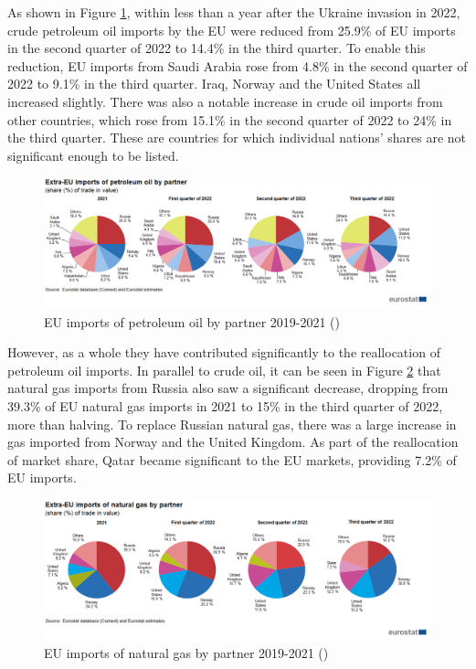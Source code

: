 \documentclass[12pt]{article}
\begin{document}
As shown in Figure \ref{fig:eu oil import}, within less than a year after the Ukraine invasion in 2022, crude petroleum oil imports by the EU were reduced from 25.9\% of EU imports in the second quarter of 2022 to 14.4\% in the third quarter. To enable this reduction, EU imports from Saudi Arabia rose from 4.8\% in the second quarter of 2022 to 9.1\% in the third quarter. Iraq, Norway and the United States all increased slightly. There was also a notable increase in crude oil imports from other countries, which rose from 15.1\% in the second quarter of 2022 to 24\% in the third quarter. These are countries for which individual nations' shares are not significant enough to be listed. 

\begin{figure}[h]
    \centering
    \includegraphics[width=\textwidth]{images/eu oil import.png}
    \caption{EU imports of petroleum oil by partner 2019-2021 (\citeauthor{eurostat_2022})}
    \label{fig:eu oil import}
\end{figure}

However, as a whole they have contributed significantly to the reallocation of petroleum oil imports. In parallel to crude oil, it can be seen in Figure \ref{fig:eu nat gas import} that natural gas imports from Russia also saw a significant decrease, dropping from 39.3\% of EU natural gas imports in 2021 to 15\% in the third quarter of 2022, more than halving. To replace Russian natural gas, there was a large increase in gas imported from Norway and the United Kingdom. As part of the reallocation of market share, Qatar became significant to the EU markets, providing 7.2\% of EU imports.

\begin{figure}[h]
    \centering
    \includegraphics[width=\textwidth]{images/eu nat gas import.png}
    \caption{EU imports of natural gas by partner 2019-2021 (\citeauthor{eurostat_2022})}
    \label{fig:eu nat gas import}
\end{figure}
\end{document}

